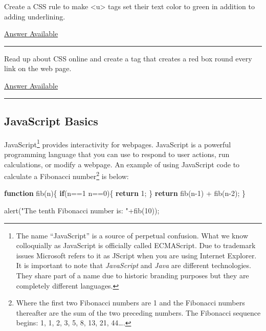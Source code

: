 \documentclass[]{memoir}
\newenvironment{Shaded}{}{}
\newcommand{\KeywordTok}[1]{\textcolor[rgb]{0.00,0.44,0.13}{\textbf{{#1}}}}
\newcommand{\DecValTok}[1]{\textcolor[rgb]{0.25,0.63,0.44}{{#1}}}
\newcommand{\StringTok}[1]{\textcolor[rgb]{0.25,0.44,0.63}{{#1}}}
\newcommand{\FunctionTok}[1]{\textcolor[rgb]{0.02,0.16,0.49}{{#1}}}
\newcommand{\NormalTok}[1]{{#1}}
\begin{document}

Create a CSS rule to make \textless{}u\textgreater{} tags set their text
color to green in addition to adding underlining.

\hyperref[Ans-14-4]{Answer Available}

\begin{center}\rule{3in}{0.4pt}\end{center}


Read up about CSS online and create a tag that creates a red box round
every link on the web page.

\hyperref[Ans-14-5]{Answer Available}

\begin{center}\rule{3in}{0.4pt}\end{center}

\subsection{JavaScript Basics}

JavaScript\footnote{The name ``JavaScript'' is a source of perpetual
  confusion. What we know colloquially as JavaScript is officially
  called ECMAScript. Due to trademark issues Microsoft refers to it as
  JScript when you are using Internet Explorer. It is important to note
  that \emph{JavaScript} and \emph{Java} are different technologies.
  They share part of a name due to historic branding purposes but they
  are completely different languages.} provides interactivity for
webpages. JavaScript is a powerful programming language that you can use
to respond to user actions, run calculations, or modify a webpage. An
example of using JavaScript code to calculate a Fibonacci
number\footnote{Where the first two Fibonacci numbers are 1 and the
  Fibonacci numbers thereafter are the sum of the two preceding numbers.
  The Fibonacci sequence begins: 1, 1, 2, 3, 5, 8, 13, 21, 44\ldots{}.}
is below:

\begin{Shaded}
\begin{Highlighting}[]
\KeywordTok{function} \FunctionTok{fib}\NormalTok{(n)\{}
    \KeywordTok{if}\NormalTok{(n==}\DecValTok{1} \NormalTok{\textbar{}\textbar{} n==}\DecValTok{0}\NormalTok{)\{}
        \KeywordTok{return} \DecValTok{1}\NormalTok{;}
    \NormalTok{\}}
    \KeywordTok{return} \FunctionTok{fib}\NormalTok{(n}\DecValTok{-1}\NormalTok{) + }\FunctionTok{fib}\NormalTok{(n}\DecValTok{-2}\NormalTok{);}
\NormalTok{\}}

\FunctionTok{alert}\NormalTok{(}\StringTok{"The tenth Fibonacci number is: "}\NormalTok{+}\FunctionTok{fib}\NormalTok{(}\DecValTok{10}\NormalTok{));}
\end{Highlighting}
\end{Shaded}
\end{document}
